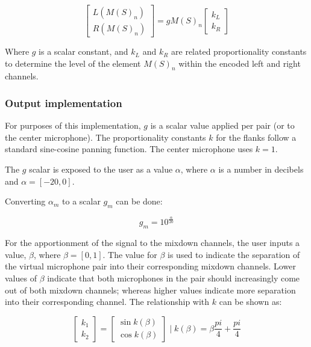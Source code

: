 \begin{equation}\label{output}
\begin{bmatrix} L(M(S)_n) \\ R(M(S)_n) \end{bmatrix} = gM(S)_n \begin{bmatrix} k_L \\ k_R \end{bmatrix}
\end{equation}

Where $g$ is a scalar constant, and $k_L$ and $k_R$ are related proportionality constants to determine the level of the element $M(S)_n$ within the encoded left and right channels. 

\subsubsection{Output implementation}

For purposes of this implementation, $g$ is a scalar value applied per pair (or to the center microphone). The proportionality constants $k$ for the flanks follow a standard sine-cosine panning function. The center microphone uses $k = 1$.

The $g$ scalar is exposed to the user as a value $\alpha$, where $\alpha$ is a number in decibels and $\alpha = [-20,0]$.

Converting $\alpha_m$ to a scalar $g_m$ can be done:

\begin{equation}
g_m = 10^{\frac{\alpha}{20}}
\end{equation}

For the apportionment of the signal to the mixdown channels, the user inputs a value, $\beta$, where $\beta = [0, 1]$. The value for $\beta$ is used to indicate the separation of the virtual microphone pair into their corresponding mixdown channels. Lower values of $\beta$ indicate that both microphones in the pair should increasingly come out of both mixdown channels; whereas higher values indicate more separation into their corresponding channel. The relationship with $k$ can be shown as:

\begin{equation}\label{pairsPanning}
\begin{bmatrix} k_1 \\ k_2 \end{bmatrix} = \begin{bmatrix} \sin{k(\beta)} \\ \cos{k(\beta)} \end{bmatrix} \; | \; k(\beta) = \beta\frac{pi}{4} + \frac{pi}{4}
\end{equation}

